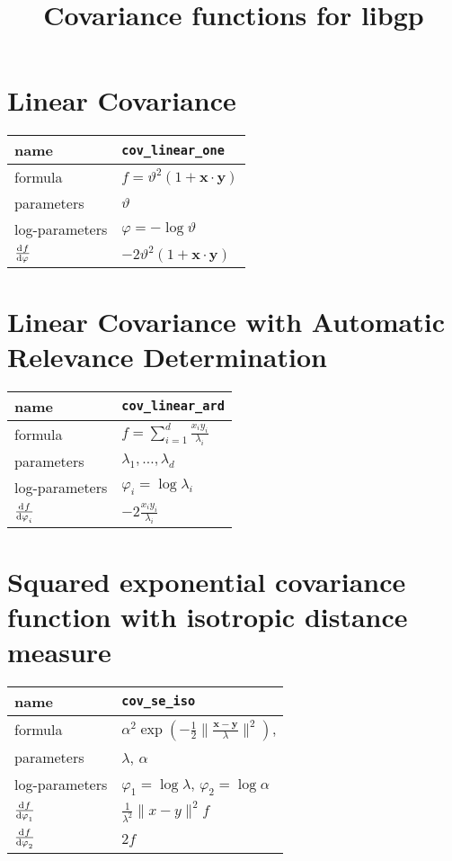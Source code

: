 \documentclass[fleqn]{article}
\title{Covariance functions for libgp}
\newcommand{\NL}{\\ \midrule} %
\begin{document}
\setlength{\mathindent}{0.0pt}


\maketitle

\section{Linear Covariance}

\begin{tabularx}{\textwidth}{@{} X X @{}}
%
name & \verb|cov_linear_one| \NL 
 formula & $f = \vartheta^2 (1+\bm{x}\cdot \bm{y}) $ \NL
% 
parameters & $\vartheta$  \NL
% 
log-parameters & $\varphi = -\log \vartheta$  \NL
%
$\displaystyle \od{f}{\varphi}$ & $ -2\vartheta^2 (1+\bm{x}\cdot \bm{y}) $ \NL 
%
\end{tabularx}






\section{Linear Covariance with Automatic Relevance Determination}


\begin{tabularx}{\textwidth}{@{} X X @{}}
%
name & \verb|cov_linear_ard|  \NL
 formula &  $\displaystyle  f = \sum_{i=1}^d \frac{ {x}_i {y}_i }{ \lambda_i } $  \NL
% 
parameters & $\lambda_1,\ldots,\lambda_d$ \NL
% 
log-parameters & $\varphi_i = \log \lambda_i$  \NL
%
$\displaystyle \od{f}{\varphi_i}$ & $ \displaystyle -2 \frac{ {x}_i {y}_i }{ \lambda_i } $ \NL 
%
\end{tabularx}







\section{Squared exponential covariance function with isotropic distance measure}

\begin{tabularx}{\textwidth}{@{} X X @{}}
%
name & \verb|cov_se_iso|  \NL
 formula &  $\alpha^2 \exp\left( -\frac{1}{2} \|  \frac{\bm{x}-\bm{y}}{\lambda}  \|^2 \right) $,  \NL
% 
parameters &  $\lambda$, $\alpha$  \NL
% 
log-parameters & $\varphi_1 = \log \lambda$, $\varphi_2 = \log \alpha $ \NL
%
$\displaystyle \od{f}{\varphi_1}$ & $\displaystyle \frac{1}{\lambda^2} \|x-y\|^2 f$ \NL
$\displaystyle \od{f}{\varphi_2}$ & $2f$ \NL
%
\end{tabularx}
\end{document}
